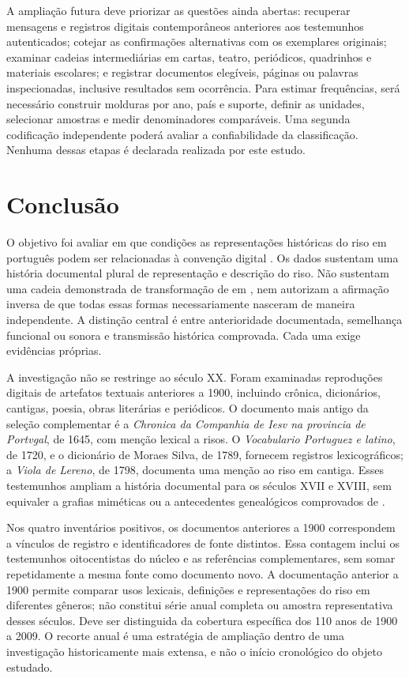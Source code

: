 A ampliação futura deve priorizar as questões ainda abertas: recuperar mensagens e registros digitais contemporâneos anteriores aos testemunhos autenticados; cotejar as confirmações alternativas com os exemplares originais; examinar cadeias intermediárias em cartas, teatro, periódicos, quadrinhos e materiais escolares; e registrar documentos elegíveis, páginas ou palavras inspecionadas, inclusive resultados sem ocorrência. Para estimar frequências, será necessário construir molduras por ano, país e suporte, definir as unidades, selecionar amostras e medir denominadores comparáveis. Uma segunda codificação independente poderá avaliar a confiabilidade da classificação. Nenhuma dessas etapas é declarada realizada por este estudo.

\section{Conclusão}

O objetivo foi avaliar em que condições as representações históricas do riso em português podem ser relacionadas à convenção digital . Os dados sustentam uma história documental plural de representação e descrição do riso. Não sustentam uma cadeia demonstrada de transformação de  em , nem autorizam a afirmação inversa de que todas essas formas necessariamente nasceram de maneira independente. A distinção central é entre anterioridade documentada, semelhança funcional ou sonora e transmissão histórica comprovada. Cada uma exige evidências próprias.

A investigação não se restringe ao século XX. Foram examinadas reproduções digitais de artefatos textuais anteriores a 1900, incluindo crônica, dicionários, cantigas, poesia, obras literárias e periódicos. O documento mais antigo da seleção complementar é a \textit{Chronica da Companhia de Iesv na provincia de Portvgal}, de 1645, com menção lexical a risos. O \textit{Vocabulario Portuguez e latino}, de 1720, e o dicionário de Moraes Silva, de 1789, fornecem registros lexicográficos; a \textit{Viola de Lereno}, de 1798, documenta uma menção ao riso em cantiga. Esses testemunhos ampliam a história documental para os séculos XVII e XVIII, sem equivaler a grafias miméticas ou a antecedentes genealógicos comprovados de  \cite{r4chronicacompanhiaiesvportugal,r4vocabularioportuguezlatino,r4diccionariolinguaportuguezamorais,r4violadelereno}.

Nos quatro inventários positivos, os documentos anteriores a 1900 correspondem a \PreNineteenLinks{} vínculos de registro e \PreNineteenSources{} identificadores de fonte distintos. Essa contagem inclui os testemunhos oitocentistas do núcleo e as referências complementares, sem somar repetidamente a mesma fonte como documento novo. A documentação anterior a 1900 permite comparar usos lexicais, definições e representações do riso em diferentes gêneros; não constitui série anual completa ou amostra representativa desses séculos. Deve ser distinguida da cobertura específica dos 110 anos de 1900 a 2009. O recorte anual é uma estratégia de ampliação dentro de uma investigação historicamente mais extensa, e não o início cronológico do objeto estudado.

